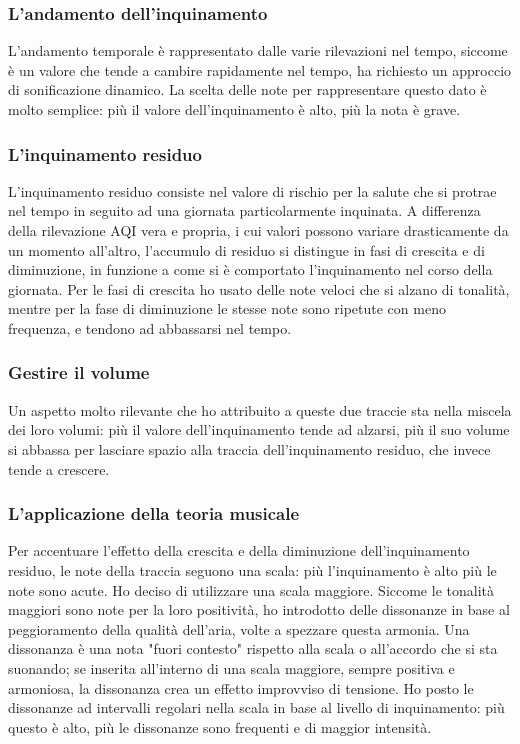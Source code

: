 \subsubsection{L'andamento dell'inquinamento}
L'andamento temporale è rappresentato dalle varie rilevazioni nel tempo, siccome è un valore che tende a cambire rapidamente nel tempo, ha richiesto un approccio di sonificazione dinamico.
La scelta delle note per rappresentare questo dato è molto semplice: più il valore dell'inquinamento è alto, più la nota è grave.
\subsubsection{L'inquinamento residuo}
L'inquinamento residuo consiste nel valore di rischio per la salute che si protrae nel tempo in seguito ad una giornata particolarmente inquinata.
A differenza della rilevazione AQI vera e propria, i cui valori possono variare drasticamente da un momento all'altro, l'accumulo di residuo si distingue in fasi di crescita e di diminuzione, in funzione a come si è comportato l'inquinamento nel corso della giornata.
Per le fasi di crescita ho usato delle note veloci che si alzano di tonalità, mentre per la fase di diminuzione le stesse note sono ripetute con meno frequenza, e tendono ad abbassarsi nel tempo.
\subsubsection{Gestire il volume}
Un aspetto molto rilevante che ho attribuito a queste due traccie sta nella miscela dei loro volumi: più il valore dell'inquinamento tende ad alzarsi, più il suo volume si abbassa per lasciare spazio alla traccia dell'inquinamento residuo, che invece tende a crescere.
\subsubsection{L'applicazione della teoria musicale}
Per accentuare l'effetto della crescita e della diminuzione dell'inquinamento residuo, le note della traccia seguono una scala: più l'inquinamento è alto più le note sono acute.
Ho deciso di utilizzare una scala maggiore. Siccome le tonalità maggiori sono note per la loro positività, ho introdotto delle dissonanze in base al peggioramento della qualità dell'aria, volte a spezzare questa armonia.
Una dissonanza è una nota "fuori contesto" rispetto alla scala o all'accordo che si sta suonando; se inserita all'interno di una scala maggiore, sempre positiva e armoniosa, la dissonanza crea un effetto improvviso di tensione.
Ho posto le dissonanze ad intervalli regolari nella scala in base al livello di inquinamento: più questo è alto, più le dissonanze sono frequenti e di maggior intensità.


